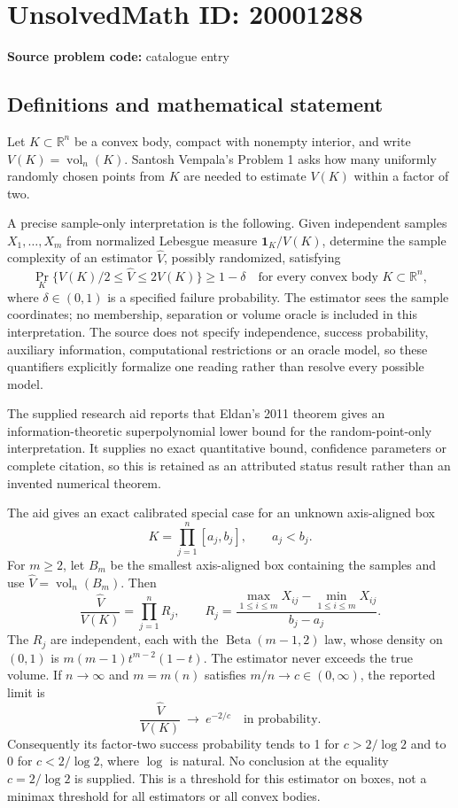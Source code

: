 \documentclass[11pt]{article}
\newcommand{\R}{\mathbb{R}}
\begin{document}
\section*{UnsolvedMath ID: 20001288}
\textbf{Source problem code:} catalogue entry
\subsection{Definitions and mathematical statement}
Let \(K\subset\R^n\) be a convex body, compact with nonempty interior, and write \(V(K)=\operatorname{vol}_n(K)\). Santosh Vempala's Problem 1 asks how many uniformly randomly chosen points from \(K\) are needed to estimate \(V(K)\) within a factor of two.

A precise sample-only interpretation is the following. Given independent samples \(X_1,\ldots,X_m\) from normalized Lebesgue measure \(\mathbf1_K/V(K)\), determine the sample complexity of an estimator \(\widehat V\), possibly randomized, satisfying
\[
\Pr_K\{V(K)/2\le\widehat V\le2V(K)\}\ge1-\delta
\quad\text{for every convex body }K\subset\R^n,
\]
where \(\delta\in(0,1)\) is a specified failure probability. The estimator sees the sample coordinates; no membership, separation or volume oracle is included in this interpretation. The source does not specify independence, success probability, auxiliary information, computational restrictions or an oracle model, so these quantifiers explicitly formalize one reading rather than resolve every possible model.

The supplied research aid reports that Eldan's 2011 theorem gives an information-theoretic superpolynomial lower bound for the random-point-only interpretation. It supplies no exact quantitative bound, confidence parameters or complete citation, so this is retained as an attributed status result rather than an invented numerical theorem.

The aid gives an exact calibrated special case for an unknown axis-aligned box
\[
K=\prod_{j=1}^n[a_j,b_j],\qquad a_j<b_j.
\]
For \(m\ge2\), let \(B_m\) be the smallest axis-aligned box containing the samples and use \(\widehat V=\operatorname{vol}_n(B_m)\). Then
\[
\frac{\widehat V}{V(K)}=\prod_{j=1}^nR_j,
\qquad
R_j=\frac{\max_{1\le i\le m}X_{ij}-\min_{1\le i\le m}X_{ij}}{b_j-a_j}.
\]
The \(R_j\) are independent, each with the \(\operatorname{Beta}(m-1,2)\) law, whose density on \((0,1)\) is \(m(m-1)t^{m-2}(1-t)\). The estimator never exceeds the true volume. If \(n\to\infty\) and \(m=m(n)\) satisfies \(m/n\to c\in(0,\infty)\), the reported limit is
\[
\frac{\widehat V}{V(K)}\ \longrightarrow\ e^{-2/c}\quad\text{in probability}.
\]
Consequently its factor-two success probability tends to 1 for \(c>2/\log2\) and to 0 for \(c<2/\log2\), where \(\log\) is natural. No conclusion at the equality \(c=2/\log2\) is supplied. This is a threshold for this estimator on boxes, not a minimax threshold for all estimators or all convex bodies.
\end{document}
